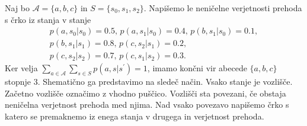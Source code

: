 \documentclass[fin1, tisk]{fmfdelo}
\newcommand{\A}{\mathcal{A}}
\theoremstyle{definition}
\begin{document}
\begin{primer}
    Naj bo $\A = \{ a, b, c \}$ in $S = \{ s_0, s_1, s_2 \}$. Napišemo le neničelne 
    verjetnosti prehoda s črko iz stanja v stanje
    \begin{gather*}
        p(a, s_0|s_0) = 0.5, \, p(a, s_1|s_0) = 0.4, \, p(b, s_1|s_0) = 0.1, \\
        p(b, s_1|s_1) = 0.8, \, p(c, s_2|s_1) = 0.2, \\
        p(c, s_2|s_2) = 0.7, \, p(c, s_1|s_2) = 0.3.
    \end{gather*}
    Ker velja $\sum_{a \in \A} \sum_{s \in S} p(a, s|s^\prime) = 1$,  imamo končni vir abecede 
    $\{ a, b, c \}$ stopnje $3$. Shematično ga predstavimo na sledeč način. Vsako stanje je 
    vozlišče. Začetno vozlišče označimo z vhodno puščico. Vozlišči sta povezani, če obstaja 
    neničelna verjetnost prehoda med njima. Nad vsako povezavo napišemo črko s katero se 
    premaknemo iz enega stanja v drugega in verjetnost prehoda.
    \begin{figure}[H] 
        \centering 
\end{figure}
\end{primer}
\end{document}
